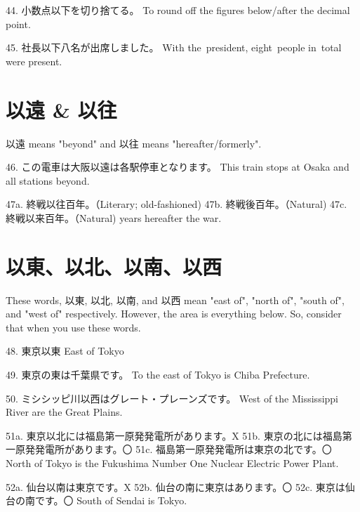 \par{44. 小数点以下を切り捨てる。 \hfill\break
To round off the figures below\slash after the decimal point. }

\par{45. 社長以下八名が出席しました。 \hfill\break
With the president, eight people in total were present.  }
      
\section{以遠 \& 以往}
 
\par{ 以遠 means "beyond" and 以往 means "hereafter\slash formerly". }

\par{46. この電車は大阪以遠は各駅停車となります。 \hfill\break
This train stops at Osaka and all stations beyond. }

\par{47a. 終戦以往百年。（Literary; old-fashioned) \hfill\break
47b. 終戦後百年。（Natural) \hfill\break
47c. 終戦以来百年。（Natural) \hfill{} years hereafter the war. }
      
\section{以東、以北、以南、以西}
 
\par{ These words, 以東, 以北, 以南, and 以西 mean "east of", "north of", "south of", and "west of" respectively. However, the area is everything below. So, consider that when you use these words. }

\par{48. 東京以東 \hfill\break
East of Tokyo }

\par{49. 東京の東は千葉県です。 \hfill\break
To the east of Tokyo is Chiba Prefecture. }

\par{50. ミシシッピ川以西はグレート・プレーンズです。 \hfill\break
West of the Mississippi River are the Great Plains. }

\par{51a. 東京以北には福島第一原発発電所があります。X \hfill\break
51b. 東京の北には福島第一原発発電所があります。〇 \hfill\break
51c. 福島第一原発発電所は東京の北です。〇 \hfill\break
North of Tokyo is the Fukushima Number One Nuclear Electric Power Plant. }

\par{52a. 仙台以南は東京です。X \hfill\break
52b. 仙台の南に東京はあります。〇 \hfill\break
52c. 東京は仙台の南です。〇 \hfill\break
South of Sendai is Tokyo. }
    